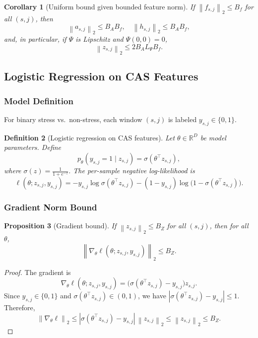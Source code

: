 \documentclass[11pt]{article}
\newtheorem{definition}{Definition}[section]
\newtheorem{proposition}[definition]{Proposition}
\newtheorem{corollary}[definition]{Corollary}
\newcommand{\R}{\mathbb{R}}
\newcommand{\norm}[1]{\left\lVert #1 \right\rVert}
\newcommand{\abs}[1]{\left\lvert #1 \right\rvert}
\begin{document}
\begin{corollary}[Uniform bound given bounded feature norm]
If \(\norm{f_{s,j}}_2 \le B_f\) for all \((s,j)\), then
\[
  \norm{a_{s,j}}_2 \le B_A B_f, \quad
  \norm{h_{s,j}}_2 \le B_A B_f,
\]
and, in particular, if \(\Psi\) is Lipschitz and \(\Psi(0,0) = 0\),
\[
  \norm{z_{s,j}}_2 \le 2 B_A L_\Psi B_f.
\]
\end{corollary}

\subsection{Logistic Regression on CAS Features}

\subsubsection{Model Definition}

For binary stress vs.\ non-stress, each window \((s,j)\) is labeled \(y_{s,j} \in \{0,1\}\).

\begin{definition}[Logistic regression on CAS features]
Let \(\theta \in \R^D\) be model parameters.
Define
\[
  p_\theta(y_{s,j}=1 \mid z_{s,j}) = \sigma(\theta^\top z_{s,j}),
\]
where \(\sigma(z) = \frac{1}{1+e^{-z}}\).
The per-sample negative log-likelihood is
\[
  \ell(\theta; z_{s,j}, y_{s,j})
  = -y_{s,j} \log \sigma(\theta^\top z_{s,j})
    - (1-y_{s,j}) \log \bigl(1-\sigma(\theta^\top z_{s,j})\bigr).
\]
\end{definition}

\subsubsection{Gradient Norm Bound}

\begin{proposition}[Gradient bound]
If \(\norm{z_{s,j}}_2 \le B_Z\) for all \((s,j)\), then for all \(\theta\),
\[
  \norm{\nabla_\theta \ell(\theta; z_{s,j}, y_{s,j})}_2 \le B_Z.
\]
\end{proposition}

\begin{proof}
The gradient is
\[
  \nabla_\theta \ell(\theta; z_{s,j}, y_{s,j})
  = \bigl(\sigma(\theta^\top z_{s,j}) - y_{s,j}\bigr) z_{s,j}.
\]
Since \(y_{s,j} \in \{0,1\}\) and \(\sigma(\theta^\top z_{s,j}) \in (0,1)\), we have
\(\abs{\sigma(\theta^\top z_{s,j}) - y_{s,j}} \le 1\).
Therefore,
\[
  \norm{\nabla_\theta \ell}_2
  \le \abs{\sigma(\theta^\top z_{s,j}) - y_{s,j}} \,\norm{z_{s,j}}_2
  \le \norm{z_{s,j}}_2 \le B_Z.
\]
\end{proof}
\end{document}
